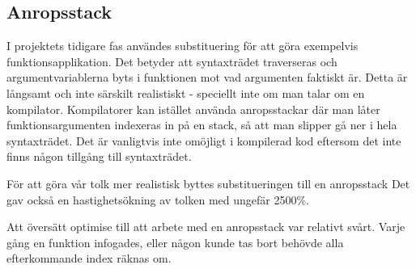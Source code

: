 \documentclass[Rapport]{subfiles}
\begin{document}
\subsection{Anropsstack}

I projektets tidigare fas användes substituering för att göra exempelvis funktionsapplikation.
Det betyder att syntaxträdet traverseras och argumentvariablerna byts i funktionen
mot vad argumenten faktiskt är. Detta är långsamt och inte särskilt realistiskt - 
speciellt inte om man talar om en kompilator. Kompilatorer kan istället använda anropsstackar
där man låter funktionsargumenten indexeras in på en stack, så att man slipper
gå ner i hela syntaxträdet. Det är vanligtvis inte omöjligt i kompilerad kod eftersom
det inte finns någon tillgång till syntaxträdet.

För att göra vår tolk mer realistisk byttes substitueringen till en anropsstack 
Det gav också en hastighetsökning av tolken med ungefär 2500\%.


Att översätt optimise till att arbete med en anropsstack var relativt svårt. Varje gång en funktion infogades, eller någon  kunde tas bort behövde alla efterkommande index räknas om. 
\end{document}
